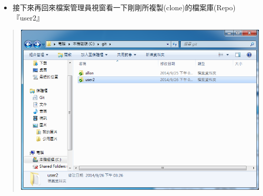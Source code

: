 \documentclass[letterpaper,10pt,english]{sphinxmanual}
\begin{document}
\begin{itemize}
\item {} 
接下來再回來檔案管理員視窗看一下剛剛所複製(clone)的檔案庫(Repo)『user2』

\end{itemize}
\begin{quote}

\includegraphics{tortoisegit-clone-007.png}
\end{quote}
\end{document}
